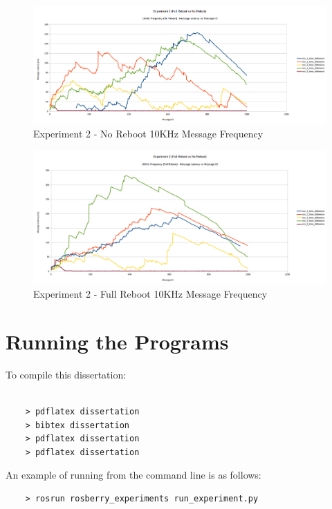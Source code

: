 \documentclass{l4proj}
\begin{document}
\begin{appendices}
\begin{figure}
\centering
\includegraphics[width=\textwidth]{images/no-reboot-10khz.png}
\caption{Experiment 2 - No Reboot 10KHz Message Frequency}
\label{exp2-noreboot-10khz}
\end{figure}

\begin{figure}
\centering
\includegraphics[width=\textwidth]{images/full-reboot-10khz.png}
\caption{Experiment 2 - Full Reboot 10KHz Message Frequency}
\label{exp2-fullreboot-10khz}
\end{figure}

\chapter{Running the Programs}

To compile this dissertation:
\begin{verbatim}

	> pdflatex dissertation
	> bibtex dissertation
	> pdflatex dissertation
    > pdflatex dissertation

\end{verbatim}


An example of running from the command line is as follows:
\begin{verbatim}
	> rosrun rosberry_experiments run_experiment.py
\end{verbatim}



\end{appendices}
\end{document}
